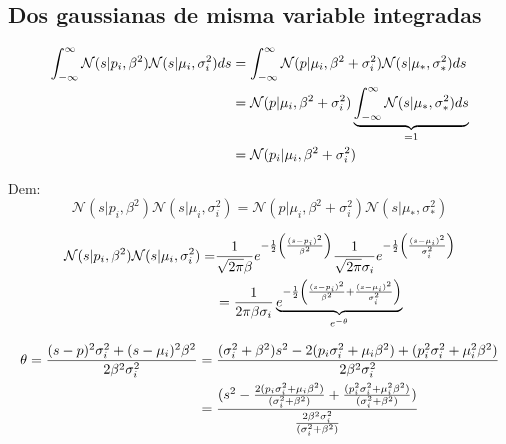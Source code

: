 \documentclass[11pt,twoside,spanish]{report} %
\begin{document}
\subsection{Dos gaussianas de misma variable integradas}
\begin{equation}
	\centering
	\begin{split}
		\int_{-\infty}^{\infty} \mathcal{N}(s \vert p_i,\beta^2) \mathcal{N}(s \vert \mu_i,\sigma_i^2)ds
		& = \int_{-\infty}^{\infty} \mathcal{N}(p \vert \mu_i,\beta^2+\sigma_i^2) \mathcal{N}(s \vert \mu_{\ast},\sigma_{\ast}^2)ds \\
		& = \mathcal{N}(p \vert \mu_i,\beta^2+\sigma_i^2) \underbrace{\int_{-\infty}^{\infty}  \mathcal{N}(s \vert \mu_{\ast},\sigma_{\ast}^2)ds}_{=1} \\
		& =  \mathcal{N}(p_i \vert \mu_i,\beta^2+\sigma_i^2)
	\end{split}
\end{equation}

Dem:
\begin{equation}\mathcal{N}(s \vert p_i,\beta^2) \mathcal{N}(s \vert \mu_i,\sigma_i^2) = \mathcal{N}(p \vert \mu_i,\beta^2+\sigma_i^2) \mathcal{N}(s \vert \mu_{\ast},\sigma_{\ast}^2)
\end{equation}

\begin{equation}
	\centering
	\begin{split}
		\mathcal{N}(s \vert p_i,\beta^2) \mathcal{N}(s \vert \mu_i,\sigma_i^2) =
		& \frac{1}{\sqrt{2\pi} \beta}e^{-\frac{1}{2}\left(\frac{(s-p_i)^2}{\beta^2}\right)}\frac{1}{\sqrt{2\pi} \sigma_i}e^{-\frac{1}{2}\left(\frac{(s-\mu_i)^2}{\sigma_i^2}\right)} \\
		& = \frac{1}{2\pi\beta\sigma_i}\underbrace{e^{-\frac{1}{2}\left(\frac{(s-p_i)^2}{\beta^2}+\frac{(s-\mu_i)^2}{\sigma_i^2}\right)}}_{e^{-\theta}}
	\end{split}
\end{equation}

\begin{equation}
	\centering
	\begin{split}
		\theta = \frac{(s-p)^2\sigma_{i}^2+(s-\mu_i)^2\beta^2}{2\beta^2\sigma_i^2}
		& = \frac{(\sigma_i^2+\beta^2)s^2-2(p_i\sigma_i^2+\mu_i\beta^2)+(p_i^2\sigma_{i}^2+\mu_{i}^2\beta^2)}{2\beta^2\sigma_{i}^2} \\
		& =\frac{(s^2-\frac{2(p_i\sigma_{i}^2+\mu_i\beta^2)}{(\sigma_{i}^2+\beta^2)}+\frac{(p_{i}^2\sigma_{i}^2+\mu_{i}^2\beta^2)}{(\sigma_i^2+\beta^2)})}{\frac{2\beta^2\sigma_{i}^2}{(\sigma_{i}^2+\beta^2)}}
	\end{split}
\end{equation}
\end{document}

